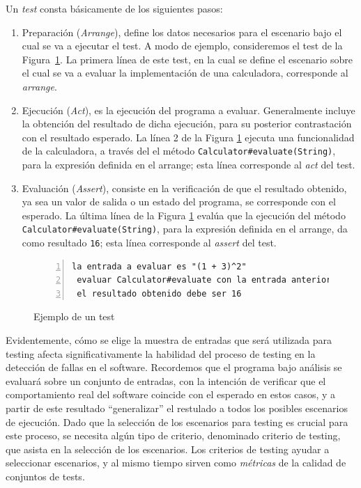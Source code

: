 Un \emph{test} consta b\'asicamente de los siguientes pasos: 
\begin{enumerate}
	\item Preparaci\'on (\emph{Arrange}), define los datos necesarios para el escenario bajo el cual se va a ejecutar el test. A modo de ejemplo, consideremos el test de la Figura~\ref{figures.examples.test.manual}. La primera l\'inea de este test, en la cual se define el escenario sobre el cual se va a evaluar la implementaci\'on de una calculadora, corresponde al \emph{arrange}.
	
	\item Ejecuci\'on (\emph{Act}), es la ejecuci\'on del programa a evaluar. Generalmente incluye la obtenci\'on del resultado de dicha ejecuci\'on, para su posterior contrastaci\'on con el resultado esperado. La l\'inea 2 de la Figura \ref{figures.examples.test.manual} ejecuta una funcionalidad de la calculadora, a trav\'es del el m\'etodo \texttt{Calculator\#evaluate(String)}, para la expresi\'on definida en el arrange; esta l\'inea corresponde al \emph{act} del test. 
	
	\item Evaluaci\'on (\emph{Assert}), consiste en la verificaci\'on de que el resultado obtenido, ya sea un valor de salida o un estado del programa, se corresponde con el esperado. La \'ultima l\'inea de la Figura \ref{figures.examples.test.manual} eval\'ua que la ejecuci\'on del m\'etodo \texttt{Calculator\#evaluate(String)}, para la expresi\'on definida en el arrange, da como resultado \texttt{16}; esta l\'inea corresponde al \emph{assert} del test.
\end{enumerate}

\begin{figure}
	\begin{lstlisting}[frame=single, mathescape=true,numbers=left,framexleftmargin=1.5em]
 la entrada a evaluar es "(1 + 3)^2"
 evaluar Calculator#evaluate con la entrada anterior
 el resultado obtenido debe ser 16
	\end{lstlisting}
	\caption{Ejemplo de un test}
	\label{figures.examples.test.manual}
\end{figure}

Evidentemente, c\'omo se elige la muestra de entradas que ser\'a utilizada para testing afecta significativamente la habilidad del proceso de testing en la detecci\'on de fallas en el software. Recordemos que el programa bajo an\'alisis se evaluar\'a sobre un conjunto de entradas, con la intenci\'on de verificar que el comportamiento real del software coincide con el esperado en estos casos, y a partir de este resultado ``generalizar'' el restulado a todos los posibles escenarios de ejecuci\'on. Dado que la selecci\'on de los escenarios para testing es crucial para este proceso, se necesita alg\'un tipo de criterio, denominado criterio de testing, que asista en la selecci\'on de los escenarios. Los criterios de testing ayudar a seleccionar escenarios, y al mismo tiempo sirven como \emph{m\'etricas} de la calidad de conjuntos de tests. 

